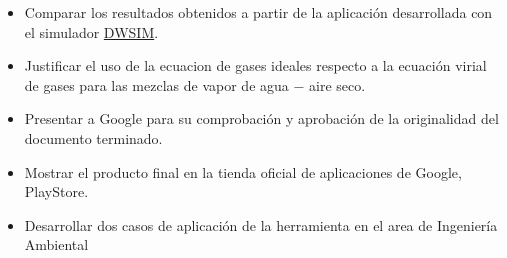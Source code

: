 \begin{itemize}
        \item Comparar los resultados obtenidos a partir de la aplicación desarrollada con el simulador \href{https://dwsim.fossee.in}{DWSIM}.
        \item Justificar el uso de la ecuacion de gases ideales respecto a la ecuación virial de gases para las mezclas de vapor de agua $-$ aire seco. %

        \item Presentar a Google para su comprobación y aprobación de la originalidad del  documento terminado.
        \item Mostrar el producto final en la tienda oficial de aplicaciones de Google, PlayStore.
        \item Desarrollar dos casos de aplicación de la herramienta en el area de Ingeniería Ambiental 
        
   
    \end{itemize}